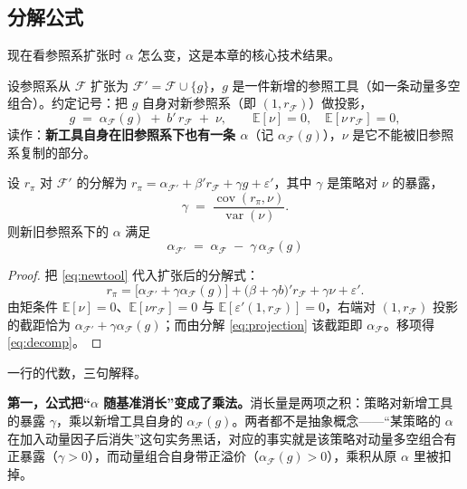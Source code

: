 \subsection{分解公式}

现在看参照系扩张时 $\alpha$ 怎么变，这是本章的核心技术结果。

设参照系从 $\mathcal{F}$ 扩张为 $\mathcal{F}'=\mathcal{F}\cup\{g\}$，$g$ 是一件新增的参照工具（如一条动量多空组合）。约定记号：把 $g$ 自身对新参照系（即 $(1,r_{\mathcal{F}})$）做投影，
\begin{equation}
  g \;=\; \alpha_{\mathcal{F}}(g) \;+\; b'\,r_{\mathcal{F}} \;+\; \nu, \qquad \mathbb{E}[\nu]=0,\quad \mathbb{E}[\nu\,r_{\mathcal{F}}]=0,
  \label{eq:newtool}
\end{equation}
读作：\textbf{新工具自身在旧参照系下也有一条 $\alpha$}（记 $\alpha_{\mathcal{F}}(g)$），$\nu$ 是它不能被旧参照系复制的部分。

\begin{proposition}[参照系分解]\label{prop:decomp}
设 $r_\pi$ 对 $\mathcal{F}'$ 的分解为 $r_\pi=\alpha_{\mathcal{F}'}+\beta' r_{\mathcal{F}}+\gamma g+\varepsilon'$，其中 $\gamma$ 是策略对 $\nu$ 的暴露，
\begin{equation}
  \gamma \;=\; \frac{\operatorname{cov}(r_\pi,\nu)}{\operatorname{var}(\nu)} .
\end{equation}
则新旧参照系下的 $\alpha$ 满足
\begin{equation}
  \boxed{\;\alpha_{\mathcal{F}'} \;=\; \alpha_{\mathcal{F}} \;-\; \gamma\,\alpha_{\mathcal{F}}(g)\;}
  \label{eq:decomp}
\end{equation}
\end{proposition}

\begin{proof}
把 \eqref{eq:newtool} 代入扩张后的分解式：
\[
  r_\pi=\bigl[\alpha_{\mathcal{F}'}+\gamma\alpha_{\mathcal{F}}(g)\bigr]+\bigl(\beta+\gamma b\bigr)'r_{\mathcal{F}}+\gamma\nu+\varepsilon' .
\]
由矩条件 $\mathbb{E}[\nu]=0$、$\mathbb{E}[\nu r_{\mathcal{F}}]=0$ 与 $\mathbb{E}[\varepsilon'(1,r_{\mathcal{F}})]=0$，右端对 $(1,r_{\mathcal{F}})$ 投影的截距恰为 $\alpha_{\mathcal{F}'}+\gamma\alpha_{\mathcal{F}}(g)$；而由分解 \eqref{eq:projection} 该截距即 $\alpha_{\mathcal{F}}$。移项得 \eqref{eq:decomp}。
\end{proof}

一行的代数，三句解释。

\textbf{第一，公式把“$\alpha$ 随基准消长”变成了乘法。}消长量是两项之积：策略对新增工具的暴露 $\gamma$，乘以新增工具自身的 $\alpha_{\mathcal{F}}(g)$。两者都不是抽象概念——“某策略的 $\alpha$ 在加入动量因子后消失”这句实务黑话，对应的事实就是该策略对动量多空组合有正暴露（$\gamma>0$），而动量组合自身带正溢价（$\alpha_{\mathcal{F}}(g)>0$），乘积从原 $\alpha$ 里被扣掉。

